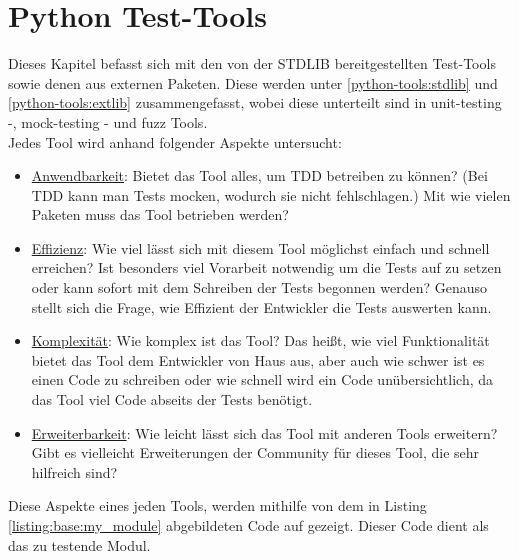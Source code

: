 \section{Python Test-Tools}\label{python-tools}

Dieses Kapitel befasst sich mit den von der STDLIB bereitgestellten Test-Tools
sowie denen aus externen Paketen.
Diese werden unter \ref{python-tools:stdlib} und \ref{python-tools:extlib}
zusammengefasst, wobei diese unterteilt sind in unit-testing -,
\gls{mock}-testing - und \gls{fuzz} Tools.
\newline
\\
Jedes Tool wird anhand folgender Aspekte untersucht:
\begin{itemize}
    \item \underline{Anwendbarkeit}:\newline
    Bietet das Tool alles, um TDD betreiben zu können? (Bei TDD
    kann man Tests \gls{mock}en, wodurch sie nicht fehlschlagen.)
    Mit wie vielen Paketen muss das Tool betrieben werden?
    
    \item \underline{Effizienz}:\newline
    Wie viel lässt sich mit diesem Tool möglichst einfach und
    schnell erreichen? Ist besonders viel Vorarbeit notwendig um die Tests
    auf zu setzen oder kann sofort mit dem Schreiben der Tests begonnen
    werden?
    \newline
    Genauso stellt sich die Frage, wie Effizient der Entwickler die Tests
    auswerten kann.
    
    \item \underline{Komplexität}:\newline
    Wie komplex ist das Tool? Das heißt, wie viel Funktionalität
    bietet das Tool dem Entwickler von Haus aus, aber auch wie schwer
    ist es einen Code zu schreiben oder wie schnell wird ein Code unübersichtlich, da
    das Tool viel Code abseits der Tests benötigt.
    
    \item \underline{Erweiterbarkeit}:\newline
    Wie leicht lässt sich das Tool mit anderen Tools erweitern?
    Gibt es vielleicht Erweiterungen der Community für dieses Tool, die sehr
    hilfreich sind?
\end{itemize}

Diese Aspekte eines jeden Tools, werden mithilfe von dem in Listing \ref{listing:base:my_module}
abgebildeten Code auf gezeigt. Dieser Code dient als das zu testende Modul.

